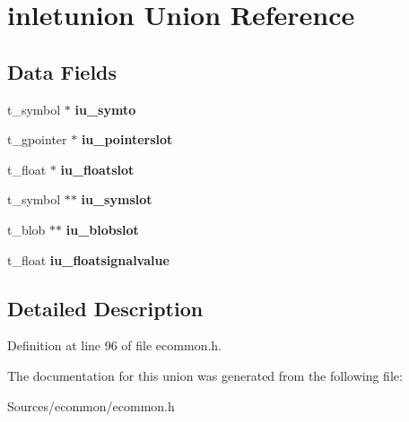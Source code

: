 \hypertarget{unioninletunion}{\section{inletunion Union Reference}
\label{unioninletunion}
}
\subsection*{Data Fields}
\begin{DoxyCompactItemize}
\item 
\hypertarget{unioninletunion_a034ef76c9ac47aad410c151b1a3072ed}{t\-\_\-symbol $\ast$ {\bfseries iu\-\_\-symto}}\label{unioninletunion_a034ef76c9ac47aad410c151b1a3072ed}

\item 
\hypertarget{unioninletunion_a765f6acce4359fbeaebd130279fdd899}{t\-\_\-gpointer $\ast$ {\bfseries iu\-\_\-pointerslot}}\label{unioninletunion_a765f6acce4359fbeaebd130279fdd899}

\item 
\hypertarget{unioninletunion_a4ea31644c26b1c46f9541353b293d3f6}{t\-\_\-float $\ast$ {\bfseries iu\-\_\-floatslot}}\label{unioninletunion_a4ea31644c26b1c46f9541353b293d3f6}

\item 
\hypertarget{unioninletunion_a347eb160d2e6d55719beabdae51a2ac9}{t\-\_\-symbol $\ast$$\ast$ {\bfseries iu\-\_\-symslot}}\label{unioninletunion_a347eb160d2e6d55719beabdae51a2ac9}

\item 
\hypertarget{unioninletunion_aa5bed621c07aa6838a05e81384933715}{t\-\_\-blob $\ast$$\ast$ {\bfseries iu\-\_\-blobslot}}\label{unioninletunion_aa5bed621c07aa6838a05e81384933715}

\item 
\hypertarget{unioninletunion_a4b62c62214438358765fee52d88ac7c5}{t\-\_\-float {\bfseries iu\-\_\-floatsignalvalue}}\label{unioninletunion_a4b62c62214438358765fee52d88ac7c5}

\end{DoxyCompactItemize}


\subsection{Detailed Description}


Definition at line 96 of file ecommon.\-h.



The documentation for this union was generated from the following file\-:\begin{DoxyCompactItemize}
\item 
Sources/ecommon/ecommon.\-h\end{DoxyCompactItemize}
